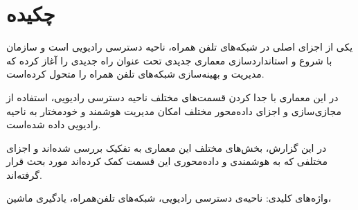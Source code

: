 \chapter{چکیده}
یکی از اجزای اصلی در شبکه‌های تلفن همراه، ناحیه دسترسی رادیویی است و سازمان 
با شروع و استانداردسازی معماری جدیدی تحت عنوان
راه جدیدی را آغاز کرده که مدیریت و بهینه‌سازی شبکه‌های تلفن همراه را متحول کرده‌است. 

در این معماری با جدا کردن قسمت‌های مختلف ناحیه دسترسی رادیویی، استفاده از مجازی‌سازی و اجزای داده‌محور مختلف امکان مدیریت هوشمند و خودمختار به ناحیه رادیویی داده شده‌است. 

در این گزارش، بخش‌های مختلف این معماری به تفکیک بررسی شده‌اند و اجزای مختلفی که به هوشمندی و داده‌محوری این قسمت کمک کرده‌اند مورد بحث قرار گرفته‌اند.

واژه‌های کلیدی: ناحیه‌ی دسترسی رادیویی، شبکه‌های تلفن‌همراه، یادگیری ماشین، 
